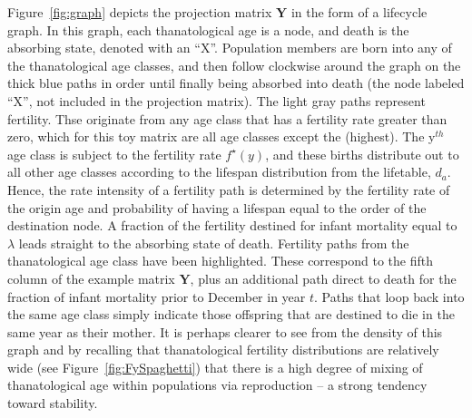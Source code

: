 \documentclass{article}
\begin{document}
Figure~\ref{fig:graph} depicts the projection matrix $\textbf{Y}$ in the form of
a lifecycle graph.  In this graph, each thanatological age is a node, and death
is the absorbing state, denoted with an ``X''.
Population members are born into any of the thanatological age classes, and then follow
clockwise around the graph on the thick blue paths in order until finally being
absorbed into death (the node labeled ``X'', not included in the projection matrix). The light gray paths represent fertility. Thse originate from any age class that has a fertility rate greater
than zero, which for this toy matrix are all age classes except the 
(highest). The y$^{th}$ age class is subject to the fertility rate $f^\star
(y)$, and these births distribute out to all other age classes according to the
lifespan distribution from the lifetable, $d_a$. Hence, the rate intensity of a
fertility path is determined by the fertility rate of the origin age and
probability of having a lifespan equal to the order of the destination node.  A fraction of
the fertility destined for infant mortality equal to $\lambda$ leads straight to the absorbing state of death. Fertility paths from the  thanatological age class have been highlighted. These correspond to the fifth column of the example matrix $\textbf{Y}$, plus an additional path
direct to death for the fraction of infant mortality prior to December 
in year $t$. Paths that loop back into the same age class simply indicate those
offspring that are destined to die in the same year as their mother. It is
perhaps clearer to see from the density of this graph and by recalling that
thanatological fertility distributions are relatively wide (see
Figure~\ref{fig:FySpaghetti}) that there is a high degree of mixing of
thanatological age within populations via reproduction -- a strong tendency
toward stability.
\end{document}
